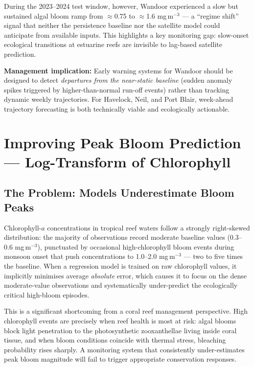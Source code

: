 \documentclass[12pt,a4paper]{report}
\begin{document}
\begin{findingbox}
During the 2023--2024 test window, however, Wandoor experienced a slow but sustained
algal bloom ramp from $\approx$0.75 to $\approx$1.6 mg\,m$^{-3}$ --- a ``regime shift''
signal that neither the persistence baseline nor the satellite model could anticipate
from available inputs. This highlights a key monitoring gap: slow-onset ecological
transitions at estuarine reefs are invisible to lag-based satellite prediction.

\vspace{6pt}
\textbf{Management implication:} Early warning systems for Wandoor should be
designed to detect \textit{departures from the near-static baseline} (sudden
anomaly spikes triggered by higher-than-normal run-off events) rather than tracking
dynamic weekly trajectories. For Havelock, Neil, and Port Blair, week-ahead
trajectory forecasting is both technically viable and ecologically actionable.
\end{findingbox}

\section{Improving Peak Bloom Prediction --- Log-Transform of Chlorophyll}
\label{sec:logtransform}

\subsection{The Problem: Models Underestimate Bloom Peaks}

Chlorophyll-$a$ concentrations in tropical reef waters follow a strongly right-skewed
distribution: the majority of observations record moderate baseline values (0.3--0.6
mg\,m$^{-3}$), punctuated by occasional high-chlorophyll bloom events during monsoon
onset that push concentrations to 1.0--2.0 mg\,m$^{-3}$ --- two to five times the
baseline. When a regression model is trained on raw chlorophyll values, it implicitly
minimises average \textit{absolute} error, which causes it to focus on the dense
moderate-value observations and systematically under-predict the ecologically critical
high-bloom episodes.

This is a significant shortcoming from a coral reef management perspective. High
chlorophyll events are precisely when reef health is most at risk: algal blooms block
light penetration to the photosynthetic zooxanthellae living inside coral tissue,
and when bloom conditions coincide with thermal stress, bleaching probability rises
sharply. A monitoring system that consistently under-estimates peak bloom magnitude
will fail to trigger appropriate conservation responses.
\end{document}
